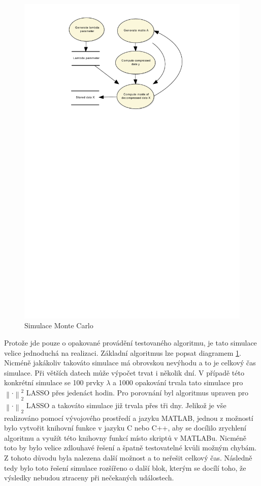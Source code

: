 \documentclass[FM,BP]{tulthesis}
\begin{document}
\begin{figure}[!ht]
	\begin{center}
		\includegraphics[scale=0.8]{obr/mcsim.pdf}
	\end{center}
	\caption{Simulace Monte Carlo}
	\label{fig:mcSim}
\end{figure}

Protože jde pouze o opakované provádění testovaného algoritmu, je tato simulace velice jednoduchá na realizaci. Základní algoritmus lze popsat diagramem \ref{fig:mcSim}. Nicméně jakákoliv takováto simulace má obrovskou nevýhodu a to je celkový čas simulace. Při větších datech může výpočet trvat i několik dní. V případě této konkrétní simulace se 100 prvky $\lambda$ a 1000 opakování trvala tato simulace pro $\left\| \cdot\right\|_{2}^{2} $ LASSO přes jedenáct hodin. Pro porovnání byl algoritmus upraven pro $\left\| \cdot \right\|_2 $ LASSO a takováto simulace již trvala přes tři dny. Jelikož je vše realizováno pomocí vývojového prostředí a jazyku MATLAB, jednou z možností bylo vytvořit knihovní funkce v jazyku C nebo C++, aby se docílilo zrychlení algoritmu a využít této knihovny funkcí místo skriptů v MATLABu. Nicméně toto by bylo velice zdlouhavé řešení a špatně testovatelné kvůli možným chybám. Z tohoto důvodu byla nalezena další možnost a to neřešit celkový čas. Následně tedy bylo toto řešení simulace rozšířeno o další blok, kterým se docílí toho, že výsledky nebudou ztraceny při nečekaných událostech.
\end{document}

